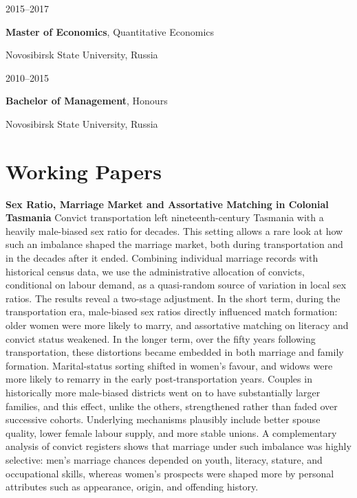 \documentclass[11pt,a4paper]{article}
\newcommand{\entry}[2]{%
  \begin{minipage}[t]{0.15\textwidth}\raggedright\small #1\end{minipage}%
  \hfill%
  \begin{minipage}[t]{0.83\textwidth}#2\end{minipage}%
  \par\vspace{5pt}}
\newcommand{\nodate}[1]{#1\par\vspace{7pt}}
\newcommand{\paper}[3]{%
  \emph{``#1''}\par\vspace{1pt}
  \ifx\relax#2\relax\else{\small #2}\par\vspace{1pt}\fi
  {\small #3}\par}
\begin{document}
\entry{2015--2017}{\textbf{Master of Economics}, Quantitative Economics\par
  Novosibirsk State University, Russia}

\entry{2010--2015}{\textbf{Bachelor of Management}, Honours\par
  Novosibirsk State University, Russia}


\section{Working Papers}

\nodate{\textbf{\paper
  {Sex Ratio, Marriage Market and Assortative Matching in Colonial Tasmania}}
  {\relax}
  {Convict transportation left nineteenth-century Tasmania with a heavily male-biased sex ratio for decades. This setting allows a rare look at how such an imbalance shaped the marriage market, both during transportation and in the decades after it ended. Combining individual marriage records with historical census data, we use the administrative allocation of convicts, conditional on labour demand, as a quasi-random source of variation in local sex ratios. The results reveal a two-stage adjustment. In the short term, during the transportation era, male-biased sex ratios directly influenced match formation: older women were more likely to marry, and assortative matching on literacy and convict status weakened. In the longer term, over the fifty years following transportation, these distortions became embedded in both marriage and family formation. Marital-status sorting shifted in women's favour, and widows were more likely to remarry in the early post-transportation years. Couples in historically more male-biased districts went on to have substantially larger families, and this effect, unlike the others, strengthened rather than faded over successive cohorts. Underlying mechanisms plausibly include better spouse quality, lower female labour supply, and more stable unions. A complementary analysis of convict registers shows that marriage under such imbalance was highly selective: men’s marriage chances depended on youth, literacy, stature, and occupational skills, whereas women’s prospects were shaped more by personal attributes such as appearance, origin, and offending history.}}
\newpage
\end{document}
